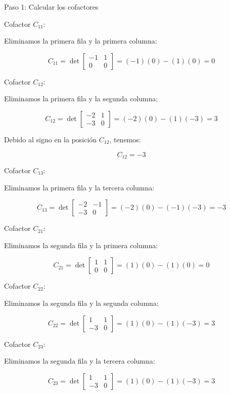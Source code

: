 \begin{enumerate}
 Paso 1: Calcular los cofactores

Cofactor \( C_{11} \):

Eliminamos la primera fila y la primera columna:

\[
C_{11} = \det\begin{bmatrix}
-1 & 1 \\
0 & 0
\end{bmatrix} = (-1)(0) - (1)(0) = 0
\]

 Cofactor \( C_{12} \):

Eliminamos la primera fila y la segunda columna:

\[
C_{12} = \det\begin{bmatrix}
-2 & 1 \\
-3 & 0
\end{bmatrix} = (-2)(0) - (1)(-3) = 3
\]

Debido al signo en la posición \( C_{12} \), tenemos:

\[
C_{12} = -3
\]

Cofactor \( C_{13} \):

Eliminamos la primera fila y la tercera columna:

\[
C_{13} = \det\begin{bmatrix}
-2 & -1 \\
-3 & 0
\end{bmatrix} = (-2)(0) - (-1)(-3) = -3
\]

 Cofactor \( C_{21} \):

Eliminamos la segunda fila y la primera columna:

\[
C_{21} = \det\begin{bmatrix}
1 & 1 \\
0 & 0
\end{bmatrix} = (1)(0) - (1)(0) = 0
\]

Cofactor \( C_{22} \):

Eliminamos la segunda fila y la segunda columna:

\[
C_{22} = \det\begin{bmatrix}
1 & 1 \\
-3 & 0
\end{bmatrix} = (1)(0) - (1)(-3) = 3
\]

Cofactor \( C_{23} \):

Eliminamos la segunda fila y la tercera columna:

\[
C_{23} = \det\begin{bmatrix}
1 & 1 \\
-3 & 0
\end{bmatrix} = (1)(0) - (1)(-3) = 3
\]


\end{enumerate}
